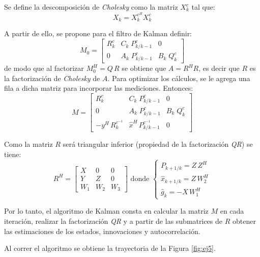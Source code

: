 	
	Se define la descomposición de \emph{Cholesky} como la matriz $X^{c}_k$ tal que:
	\begin{equation*}
		X_k = X^{c^{H}}_k X^{c}_k
	\end{equation*}	

	A partir de ello, se propone para el filtro de Kalman definir: 
	\begin{equation*}
		M_0 = \begin{bmatrix} R^{c}_k& C_k\; P^c_{k/k-1}& 0 \\[0.3em] 0& A_k\; P^c_{k/k-1}& B_k\; Q^c_k \end{bmatrix}
	\end{equation*}
	de modo que al factorizar $M^H_0 = Q\,R$ se obtiene que $A=R^H R$, es decir que $R$ es la factorización de \emph{Cholesky} de $A$. Para optimizar los cálculos, se le agrega una fila a dicha matriz para incorporar las mediciones. Entonces:
	\begin{equation*}
	M =  \begin{bmatrix} R^{c}_k& C_k\; P^c_{k/k-1}& 0 \\[0.3em] 0& A_k\; P^c_{k/k-1}& B_k\; Q^c_k \\[0.3em] -y^H\,R^{c^{-1}}_k & \hat{x}^H\, P^{c^{-1}}_{k/k-1} & 0 \end{bmatrix}
	\end{equation*}

	Como la matriz $R$ será triangular inferior (propiedad de la factorización \emph{QR}) se tiene:
	\begin{equation*}
	R^H = \begin{bmatrix} X&0&0\\[0.3em]Y&Z&0\\[0.3em]W_1&W_2&W_3\end{bmatrix} \text{ donde } \begin{cases} P_{k+1/k} = Z\,Z^H\\ \hat{x}_{k+1/k}=Z\,W^H_2\\ \hat{g}_k = -X\,W^H_1\end{cases}
	\end{equation*}

	Por lo tanto, el algoritmo de Kalman consta en calcular la matriz $M$ en cada iteración, realizar la factorización \emph{QR} y a partir de las submatrices de $R$ obtener las estimaciones de los estados, innovaciones y autocorrelación.

	Al correr el algoritmo se obtiene la trayectoria de la Figura \ref{fig:ej5}.

	\vspace*{\fill}

